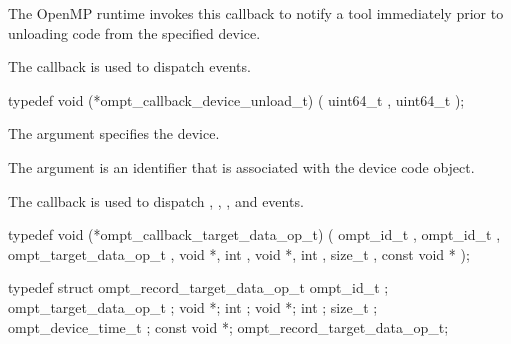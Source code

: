 \label{sec:ompt_callback_device_unload_t}

\summary
The OpenMP runtime invokes this callback to notify a tool immediately prior to unloading code from the specified device.

The  callback is used to dispatch
 events.

\format


\begin{ccppspecific}
\begin{omptCallback}
typedef void (*ompt_callback_device_unload_t) (
  uint64_t ,
  uint64_t 
);
\end{omptCallback}

\end{ccppspecific}


\argdesc

The argument  specifies the device.

The argument  is an identifier that is associated with the device code object.


\label{sec:ompt_callback_target_data_op_t}
\summary
The  callback is used to dispatch
, , ,
 and  events.

\format


\begin{ccppspecific}
\begin{omptCallback}
typedef void (*ompt_callback_target_data_op_t) (
  ompt_id_t ,
  ompt_id_t ,
  ompt_target_data_op_t ,
  void *,
  int ,
  void *,
  int ,
  size_t ,
  const void *
);
\end{omptCallback}
\end{ccppspecific}


\record

\begin{ccppspecific}
\begin{omptRecord}
typedef struct ompt_record_target_data_op_t {
  ompt_id_t ;
  ompt_target_data_op_t ;
  void *;
  int ;
  void *;
  int ;
  size_t ;
  ompt_device_time_t ;
  const void *;
} ompt_record_target_data_op_t;
\end{omptRecord}
\end{ccppspecific}


